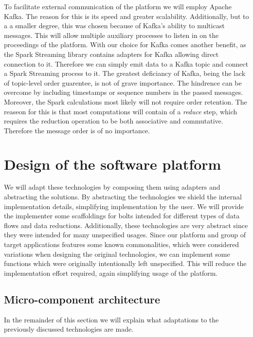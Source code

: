 To facilitate external communication of the platform we will employ Apache Kafka. The reason for this is its speed and greater scalability. Additionally, but to a a smaller degree, this was chosen because of Kafka's ability to multicast messages. This will allow multiple auxiliary processes to listen in on the proceedings of the platform. With our choice for Kafka comes another benefit, as the Spark Streaming library contains adapters for Kafka allowing direct connection to it. Therefore we can simply emit data to a Kafka topic and connect a Spark Streaming process to it. The greatest deficiancy of Kafka, being the lack of topic-level order guarentee, is not of grave importance. The hindrence can be overcome by including timestamps or sequence numbers in the passed messages. Moreover, the Spark calculations most likely will not require order retention. The reaseon for this is that most computations will contain of a \emph{reduce} step, which requires the reduction operation to be both associative and commutative\cite{ass-comm}. Therefore the message order is of no importance.

\section{Design of the software platform}
We will adapt these technologies by composing them using adapters and abstracting the solutions. By abstracting the technologies we shield the internal implementation details, simplifying implementation by the user. We will provide the implementer some scaffoldings for bolts intended for different types of data flows and data reductions. Additionally, these technologies are very abstract since they were intended for many unspecified usages. Since our platform and group of target applications features some known commonalities, which were considered variations when designing the original technologies, we can implement some functions which were originally intentionally left unspecified. This will reduce the implementation effort required, again simplifying usage of the platform. \cite{facade_pattern} 


\subsection{Micro-component architecture}
In the remainder of this section we will explain what adaptations to the previously discussed technologies are made.

